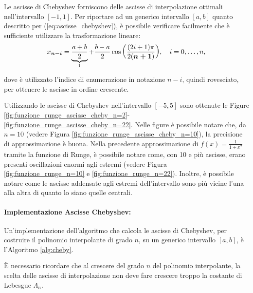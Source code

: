 \begin{remark}
    Le ascisse di Chebyshev forniscono delle ascisse di interpolazione ottimali nell'intervallo $[-1,1]$. Per riportare ad un generico intervallo $[a,b]$ quanto descritto per (\ref{eq:ascisse_chebyshev}), è possibile verificare facilmente che è sufficiente utilizzare la trasformazione lineare:
    \begin{equation*}
        x_{\boldsymbol{n-i}} =\underbrace{\frac{a+b}{2}}_{\footnotemark} + \frac{b-a}{2}\cos{\left(\frac{(2i+1)\pi}{2(\boldsymbol{n+1})}\right)},\quad i=0,\hdots,n,
    \end{equation*}
    dove è utilizzato l'indice di enumerazione in notazione $n-i$, quindi rovesciato, per ottenere le ascisse in ordine crescente. 
\end{remark}

\begin{example}
	Utilizzando le ascisse di Chebyshev nell'intervallo $[-5,5]$ sono ottenute le Figure \ref{fig:funzione_runge_ascisse_cheby_n=2}-\ref{fig:funzione_runge_ascisse_cheby_n=22}. Nelle figure è possibile notare che, da $n=10$ (vedere Figura \ref{fig:funzione_runge_ascisse_cheby_n=10}), la precisione di approssimazione è buona. Nella precedente approssimazione di $f(x)=\frac{1}{1+x^2}$ tramite la funzione di Runge, è possibile notare come, con 10 e più ascisse, erano presenti oscillazioni enormi agli estremi (vedere Figura \ref{fig:funzione_runge_n=10} e \ref{fig:funzione_runge_n=22}). Inoltre, è possibile notare come le ascisse addensate agli estremi dell'intervallo sono più vicine l'una alla altra di quanto lo siano quelle centrali.
\end{example}

\paragraph{Implementazione Ascisse Chebyshev:} Un'implementazione dell'algoritmo che calcola le ascisse di Chebyshev, per costruire il polinomio interpolante di grado $n$, su un generico intervallo $[a, b]$, è l'Algoritmo \ref{alg:cheby}.

\begin{remark}
    È necessario ricordare che al crescere del grado $n$ del polinomio interpolante, la scelta delle ascisse di interpolazione non deve fare crescere troppo la costante di Lebesgue $\Lambda_n$.
\end{remark}

